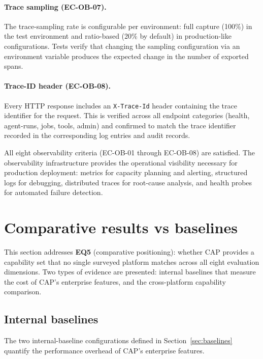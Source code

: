 \documentclass[a4paper]{sapthesis}
\begin{document}
\paragraph{Trace sampling (EC-OB-07).}
The trace-sampling rate is configurable per environment: full capture
(100\%) in the test environment and ratio-based (20\% by default) in
production-like configurations.  Tests verify that changing the sampling
configuration via an environment variable produces the expected change
in the number of exported spans.

\paragraph{Trace-ID header (EC-OB-08).}
Every HTTP response includes an \texttt{X-Trace-Id} header containing
the trace identifier for the request.  This is verified across all
endpoint categories (health, agent-runs, jobs, tools, admin) and
confirmed to match the trace identifier recorded in the corresponding
log entries and audit records.

\medskip
\noindent
All eight observability criteria (EC-OB-01 through EC-OB-08) are
satisfied.  The observability infrastructure provides the operational
visibility necessary for production deployment: metrics for capacity
planning and alerting, structured logs for debugging, distributed
traces for root-cause analysis, and health probes for automated
failure detection.


\section{Comparative results vs baselines}
\label{sec:comparative-results}

This section addresses \textbf{EQ5} (comparative positioning): whether
CAP provides a capability set that no single surveyed platform matches
across all eight evaluation dimensions.  Two types of evidence are
presented: internal baselines that measure the cost of CAP's enterprise
features, and the cross-platform capability comparison.

\subsection{Internal baselines}

The two internal-baseline configurations defined in
Section~\ref{sec:baselines} quantify the performance overhead of CAP's
enterprise features.
\end{document}
